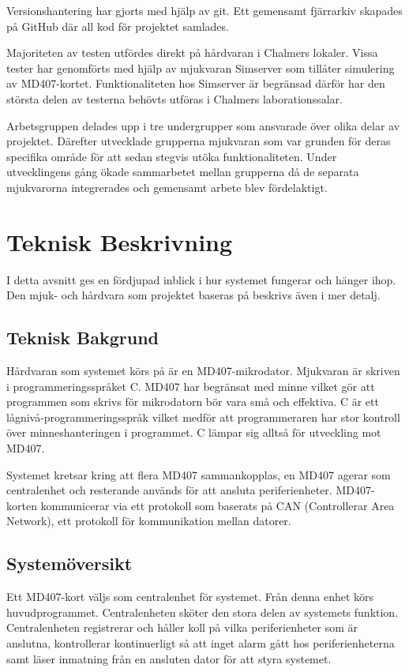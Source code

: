 \documentclass[a4paper]{article}
\begin{document}
Versionshantering har gjorts med hjälp av git.
Ett gemensamt fjärrarkiv skapades på GitHub där all kod för projektet samlades.

Majoriteten av testen utfördes direkt på hårdvaran i Chalmers lokaler.
Vissa tester har genomförts med hjälp av mjukvaran Simserver som tillåter simulering av MD407-kortet.
Funktionaliteten hos Simserver är begränsad därför har den största delen av testerna behövts utföras i Chalmers laborationssalar.

Arbetsgruppen delades upp i tre undergrupper som ansvarade över olika delar av projektet.
Därefter utvecklade grupperna mjukvaran som var grunden för deras specifika område för att sedan stegvis utöka funktionaliteten.
Under utvecklingens gång ökade sammarbetet mellan grupperna då de separata mjukvarorna integrerades och gemensamt arbete blev fördelaktigt.


\section{Teknisk Beskrivning}
I detta avsnitt ges en fördjupad inblick i hur systemet fungerar och hänger ihop.
Den mjuk- och hårdvara som projektet baseras på beskrivs även i mer detalj.

\subsection{Teknisk Bakgrund}
Hårdvaran som systemet körs på är en MD407-mikrodator.
Mjukvaran är skriven i programmeringsspråket C.
MD407 har begränsat med minne vilket gör att programmen som skrivs för mikrodatorn bör vara små och effektiva.
C är ett lågnivå-programmeringsspråk vilket medför att programmeraren har stor kontroll över minneshanteringen i programmet.
C lämpar sig alltså för utveckling mot MD407.

Systemet kretsar kring att flera MD407 sammankopplas, en MD407 agerar som centralenhet och resterande används för att ansluta periferienheter.
MD407-korten kommunicerar via ett protokoll som baserats på CAN (Controllerar Area Network), ett protokoll för kommunikation mellan datorer.

\subsection{Systemöversikt}

Ett MD407-kort väljs som centralenhet för systemet.
Från denna enhet körs huvudprogrammet.
Centralenheten sköter den stora delen av systemets funktion.
Centralenheten registrerar och håller koll på vilka periferienheter som är anslutna, kontrollerar kontinuerligt så att inget alarm gått hos periferienheterna samt läser inmatning från en ansluten dator för att styra systemet.
\end{document}
